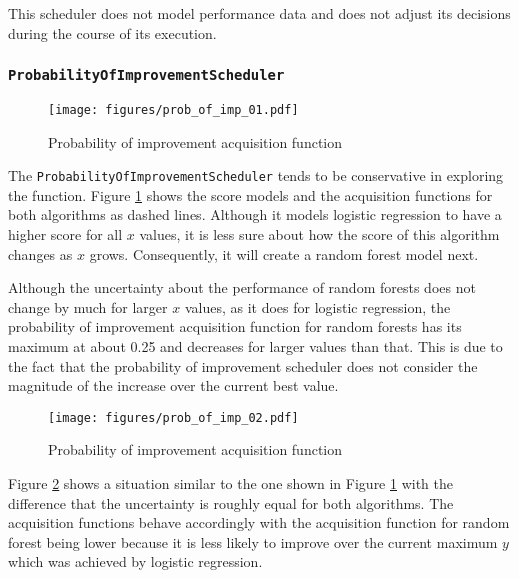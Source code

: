 \documentclass[a4paper,12pt,twoside,openright]{report}
\begin{document}
This scheduler does not model performance data and does not adjust its decisions during the course of its execution.


\subsubsection{\texttt{ProbabilityOfImprovementScheduler}}
\begin{figure}
\centering
  \texttt{[image: figures/prob\_of\_imp\_01.pdf]}
  \caption{Probability of improvement acquisition function}
  \label{sched:probofimpr1}
\end{figure}

The \texttt{ProbabilityOfImprovementScheduler} tends to be conservative in exploring the function. Figure \ref{sched:probofimpr1} shows the score models and the acquisition functions for both algorithms as dashed lines. Although it models logistic regression to have a higher score for all $x$ values, it is less sure about how the score of this algorithm changes as $x$ grows. Consequently, it will create a random forest model next.

Although the uncertainty about the performance of random forests does not change by much for larger $x$ values, as it does for logistic regression, the probability of improvement acquisition function for random forests has its maximum at about 0.25 and decreases for larger values than that. This is due to the fact that the probability of improvement scheduler does not consider the magnitude of the increase over the current best value.

\begin{figure}
\centering

  \texttt{[image: figures/prob\_of\_imp\_02.pdf]}
  \caption{Probability of improvement acquisition function}
  \label{sched:probofimpr2}
\end{figure}

Figure \ref{sched:probofimpr2} shows a situation similar to the one shown in Figure \ref{sched:probofimpr1} with the difference that the uncertainty is roughly equal for both algorithms. The acquisition functions behave accordingly with the acquisition function for random forest being lower because it is less likely to improve over the current maximum $y$ which was achieved by logistic regression.
\end{document}

